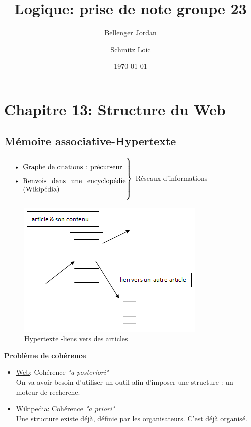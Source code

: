 \documentclass{article}
\title{Logique: prise de note groupe 23}
\author{Bellenger Jordan \and Schmitz Loic }
\date{\today}
\begin{document}
\maketitle
\section{Chapitre 13: Structure du Web}


\subsection{Mémoire associative-Hypertexte}

$
\left. \text{\parbox{0.5\linewidth}{
\begin{itemize}
\item Graphe de citations : précurseur 
\item Renvois dans une encyclopédie (Wikipédia)
\end{itemize}
}}\right\}
$ Réseaux d'informations




\begin{figure}[!h]
\centering
\includegraphics{images/23_image1.png}
\caption{Hypertexte -liens vers des articles}
\label{fig:cfc}
\end{figure}

\textbf{Problème de cohérence}

\begin{itemize}
\item \underline{Web}: Cohérence \textit{"a posteriori"} \\
                       On va avoir besoin d'utiliser un outil afin d'imposer                         une structure : un moteur de recherche. 
      
\item \underline{Wikipedia}: Cohérence \textit{"a priori"} \\
                             Une structure existe déjà, définie par les                                    organisateurs. C'est déjà organisé.
\end{itemize}
\end{document}
